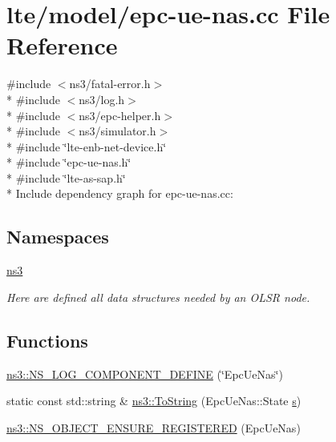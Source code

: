 \hypertarget{epc-ue-nas_8cc}{}\section{lte/model/epc-\/ue-\/nas.cc File Reference}
\label{epc-ue-nas_8cc}
{\ttfamily \#include $<$ns3/fatal-\/error.\+h$>$}\\*
{\ttfamily \#include $<$ns3/log.\+h$>$}\\*
{\ttfamily \#include $<$ns3/epc-\/helper.\+h$>$}\\*
{\ttfamily \#include $<$ns3/simulator.\+h$>$}\\*
{\ttfamily \#include \char`\"{}lte-\/enb-\/net-\/device.\+h\char`\"{}}\\*
{\ttfamily \#include \char`\"{}epc-\/ue-\/nas.\+h\char`\"{}}\\*
{\ttfamily \#include \char`\"{}lte-\/as-\/sap.\+h\char`\"{}}\\*
Include dependency graph for epc-\/ue-\/nas.cc\+:
\subsection*{Namespaces}
\begin{DoxyCompactItemize}
\item 
 \hyperlink{namespacens3}{ns3}
\begin{DoxyCompactList}\small\item\em Here are defined all data structures needed by an O\+L\+SR node. \end{DoxyCompactList}\end{DoxyCompactItemize}
\subsection*{Functions}
\begin{DoxyCompactItemize}
\item 
\hyperlink{namespacens3_a989d6d018aa3cc474234e2c04f8019e9}{ns3\+::\+N\+S\+\_\+\+L\+O\+G\+\_\+\+C\+O\+M\+P\+O\+N\+E\+N\+T\+\_\+\+D\+E\+F\+I\+NE} (\char`\"{}Epc\+Ue\+Nas\char`\"{})
\item 
static const std\+::string \& \hyperlink{namespacens3_a3d1f7e1bec1972e2ae8d64673fcfcd9c}{ns3\+::\+To\+String} (Epc\+Ue\+Nas\+::\+State \hyperlink{generate__test__data__lte__sinr_8m_ad83eeb3a142285d1243a08c6b7026df8}{s})
\item 
\hyperlink{namespacens3_a0e1b44dc05edd579dc37111a1b23f8b1}{ns3\+::\+N\+S\+\_\+\+O\+B\+J\+E\+C\+T\+\_\+\+E\+N\+S\+U\+R\+E\+\_\+\+R\+E\+G\+I\+S\+T\+E\+R\+ED} (Epc\+Ue\+Nas)
\end{DoxyCompactItemize}
